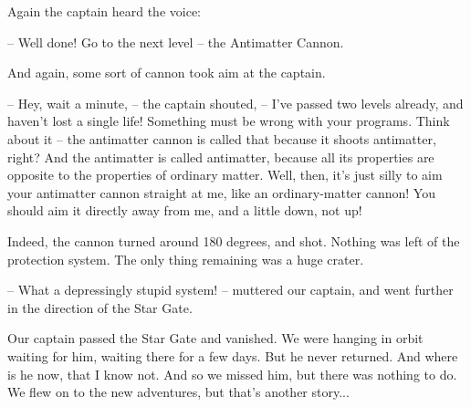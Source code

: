 \documentclass[ebook,oneside,final,openright]{memoir}
\begin{document}
\par
Again the captain heard the voice:\par
– Well done! Go to the next level – the Antimatter Cannon.\par
And again, some sort of cannon took aim at the captain.\par
– Hey, wait a minute, – the captain shouted, – I’ve passed two levels already, and haven’t lost a single life! Something must be wrong with your programs. Think about it – the antimatter cannon is called that because it shoots antimatter, right? And the antimatter is called antimatter, because all its properties are opposite to the properties of ordinary matter. Well, then, it’s just silly to aim your antimatter cannon straight at me, like an ordinary-matter cannon! You should aim it directly away from me, and a little down, not up!\par
\par
Indeed, the cannon turned around 180 degrees, and shot. Nothing was left of the protection system. The only thing remaining was a huge crater.\par
– What a depressingly stupid system! – muttered our captain, and went further in the direction of the Star Gate.\par
\par
Our captain passed the Star Gate and vanished. We were hanging in orbit waiting for him, waiting there for a few days. But he never returned. And where is he now, that I know not. And so we missed him, but there was nothing to do. We flew on to the new adventures, but that’s another story...
\end{document}

